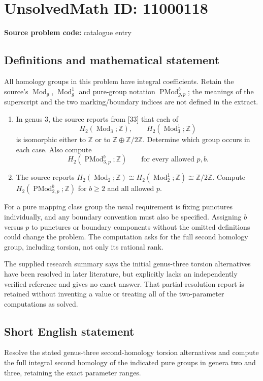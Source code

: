 \documentclass[11pt]{article}
\newcommand{\Z}{\mathbb{Z}}
\begin{document}
\section*{UnsolvedMath ID: 11000118}
\textbf{Source problem code:} catalogue entry
\subsection{Definitions and mathematical statement}
All homology groups in this problem have integral coefficients. Retain the source's \(\operatorname{Mod}_g\), \(\operatorname{Mod}_g^1\) and pure-group notation \(\operatorname{PMod}_{g,p}^{b}\); the meanings of the superscript and the two marking/boundary indices are not defined in the extract.
\begin{enumerate}
\item In genus \(3\), the source reports from [33] that each of
\[
 H_2(\operatorname{Mod}_3;\Z),\qquad
 H_2(\operatorname{Mod}_3^1;\Z)
\]
is isomorphic either to \(\Z\) or to \(\Z\oplus\Z/2\Z\). Determine which group occurs in each case. Also compute
\[
 H_2(\operatorname{PMod}_{3,p}^{b};\Z)
 \qquad\text{for every allowed }p,b.
\]
\item The source reports
\(H_2(\operatorname{Mod}_2;\Z)\cong H_2(\operatorname{Mod}_2^1;\Z)\cong\Z/2\Z\).
Compute \(H_2(\operatorname{PMod}_{2,p}^{b};\Z)\) for \(b\geq2\) and all allowed \(p\).
\end{enumerate}
For a pure mapping class group the usual requirement is fixing punctures individually, and any boundary convention must also be specified. Assigning \(b\) versus \(p\) to punctures or boundary components without the omitted definitions could change the problem. The computation asks for the full second homology group, including torsion, not only its rational rank.

The supplied research summary says the initial genus-three torsion alternatives have been resolved in later literature, but explicitly lacks an independently verified reference and gives no exact answer. That partial-resolution report is retained without inventing a value or treating all of the two-parameter computations as solved.
\subsection{Short English statement}
Resolve the stated genus-three second-homology torsion alternatives and compute the full integral second homology of the indicated pure groups in genera two and three, retaining the exact parameter ranges.
\end{document}
